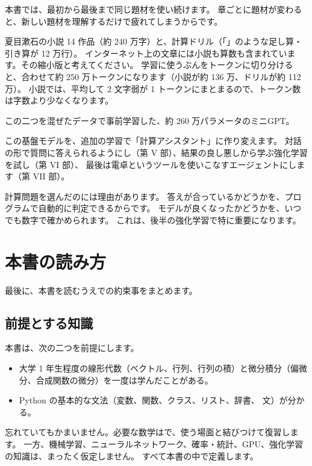 本書では、最初から最後まで同じ題材を使い続けます。
章ごとに題材が変わると、新しい題材を理解するだけで疲れてしまうからです。

\begin{description}[leftmargin=1em,style=nextline]
\item[学習データ] 夏目漱石の小説 14 作品（約 240 万字）と、計算ドリル（「」のような足し算・引き算が 12 万行）。
インターネット上の文章には小説も算数も含まれています。その縮小版と考えてください。
学習に使うぶんをトークンに切り分けると、合わせて約 250 万トークンになります（小説が約 136 万、ドリルが約 112 万）。
小説では、平均して 2 文字弱が 1 トークンにまとまるので、トークン数は字数より少なくなります。
\item[基盤モデル] この二つを混ぜたデータで事前学習した、約 260 万パラメータのミニGPT。
\item[仕上げる目標] この基盤モデルを、追加の学習で「計算アシスタント」に作り変えます。
対話の形で質問に答えられるようにし（第 V 部）、結果の良し悪しから学ぶ強化学習を試し（第 VI 部）、
最後は電卓というツールを使いこなすエージェントにします（第 VII 部）。
\end{description}

計算問題を選んだのには理由があります。
答えが合っているかどうかを、プログラムで自動的に判定できるからです。
モデルが良くなったかどうかを、いつでも数字で確かめられます。
これは、後半の強化学習で特に重要になります。

\section{本書の読み方}\label{sec:intro-how-to-read}

最後に、本書を読むうえでの約束事をまとめます。

\subsection*{前提とする知識}

本書は、次の二つを前提にします。

\begin{itemize}
\item 大学 1 年生程度の線形代数（ベクトル、行列、行列の積）と微分積分（偏微分、合成関数の微分）を一度は学んだことがある。
\item Python の基本的な文法（変数、関数、クラス、リスト、辞書、 文）が分かる。
\end{itemize}

忘れていてもかまいません。必要な数学はで、使う場面と結びつけて復習します。
一方、機械学習、ニューラルネットワーク、確率・統計、GPU、強化学習の知識は、まったく仮定しません。
すべて本書の中で定義します。

